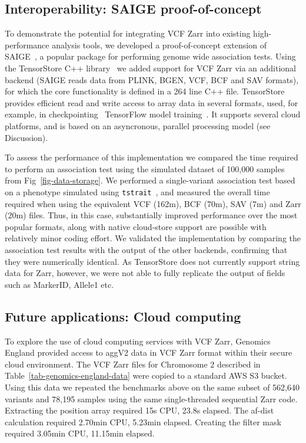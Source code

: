 \documentclass[a4paper,num-refs]{oup-contemporary}
\begin{document}
\subsection{Interoperability: SAIGE proof-of-concept}
To demonstrate the potential for integrating VCF Zarr into existing
high-performance analysis tools,
we developed a proof-of-concept extension of SAIGE~\cite{zhou2018efficiently,
zhou2020scalable}, a popular package for performing genome wide
association tests. 
Using the TensorStore C++ library~\cite{tensorstore}
we added support for VCF Zarr via an additional backend 
(SAIGE reads data from PLINK, BGEN, VCF, BCF and SAV formats),
for which the core functionality is defined in a 264 line C++ file.
TensorStore provides efficient read and write access to array
data in several formats, used, for example, in
checkpointing~\cite{orbax-tensorstore} 
TensorFlow model training~\citep{tensorflow2015-whitepaper}.
It supports several cloud platforms, and is based on an
asyncronous, parallel processing model (see Discussion).

To assess the performance of this implementation we compared the time required
to perform an association test using the simulated dataset of 100,000 samples
from Fig~\ref{fig-data-storage}. 
We performed a single-variant association
test based on a phenotype simulated using
\texttt{tstrait}~\citep{tagami2024tstrait},
and measured the overall time required when using the 
equivalent VCF (162m), BCF (70m), SAV (7m) and Zarr (20m) files.
Thus, in this case, substantially improved performance over the 
most popular formats, along with native cloud-store support are 
possible with relatively minor coding effort.
We validated the implementation by comparing the association
test results with the output of the other backends,
confirming that they were numerically identical. 
As TensorStore does not currently support string data for Zarr, 
however,
we were not able to fully replicate the output of fields 
such as MarkerID, Allele1 etc.



\subsection{Future applications: Cloud computing}
To explore the use of cloud computing services with VCF Zarr,
Genomics England provided access to aggV2 data 
in VCF Zarr format within their secure
cloud environment. The VCF Zarr files for Chromosome 2
described in Table~\ref{tab-genomics-england-data}
were copied to a standard AWS S3 bucket.
Using this data we repeated the benchmarks above on the same subset
of 562,640 variants and 78,195 samples using the same
single-threaded sequential Zarr code.
Extracting the position array required 15s CPU, 23.8s elapsed.
The af-dist calculation required 2.70min CPU, 5.23min elapsed.
Creating the filter mask required 3.05min CPU, 11.15min elapsed.
\end{document}
